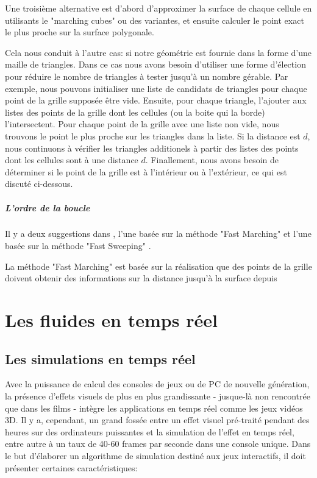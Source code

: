 \documentclass[11pt]{report}
\begin{document}
Une troisième alternative est d'abord d'approximer la surface de chaque cellule en utilisants le "marching cubes" ou des variantes, et ensuite calculer le point exact le plus proche sur la surface polygonale.\newline

Cela nous conduit à l'autre cas: si notre géométrie est fournie dans la forme d'une maille de triangles. Dans ce cas nous avons besoin d'utiliser une forme d'élection pour réduire le nombre de triangles à tester jusqu'à un nombre gérable. Par exemple, nous pouvons initialiser une liste de candidats de triangles pour chaque point de la grille supposée être vide. Ensuite, pour chaque triangle, l'ajouter aux listes des points de la grille dont les cellules (ou la boite qui la borde) l'intersectent. Pour chaque point de la grille avec une liste non vide, nous trouvons le point le plus proche sur les triangles dans la liste. Si la distance est $d$, nous continuons à vérifier les triangles additionels à partir des listes des points dont les cellules sont à une distance $d$. Finallement, nous avons besoin de déterminer si le point de la grille est à l'intérieur ou à l'extérieur, ce qui est discuté ci-dessous.

\subsubsection*{L'ordre de la boucle}

Il y a deux suggestions dans \cite{tsai-2002}, l'une basée sur la méthode "Fast Marching" \cite{sethian-1996} \cite{tsitsiklis-1995} et l'une basée sur la méthode "Fast Sweeping" \cite{zhao-2005}. 

La méthode "Fast Marching" est basée sur la réalisation que des points de la grille doivent obtenir des informations sur la distance jusqu'à la surface depuis 




\part{Les fluides en temps réel}

\chapter{Les simulations en temps réel}

Avec la puissance de calcul des consoles de jeux ou de PC de nouvelle génération, la présence d'effets visuels de plus en plus grandissante - jusque-là non rencontrée que dans les films - intègre les applications en temps réel comme les jeux vidéos 3D. Il y a, cependant, un grand fossée entre un effet visuel pré-traité pendant des heures sur des ordinateurs puissantes et la simulation de l'effet en temps réel, entre autre à un taux de 40-60 frames par seconde dans une console unique. Dans le but d'élaborer un algorithme de simulation destiné aux jeux interactifs, il doit présenter certaines caractéristiques: 
\end{document}

